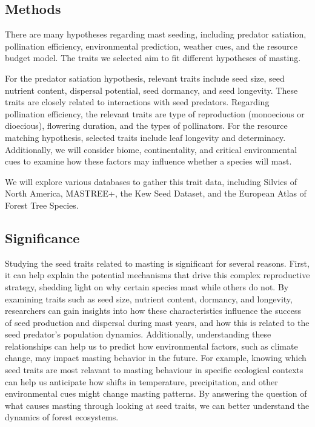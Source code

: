 \documentclass[11pt,letter]{article}
\begin{document}
\subsection{Methods}
There are many hypotheses regarding mast seeding, including predator satiation, pollination efficiency, environmental prediction, weather cues, and the resource budget model. The traits we selected aim to fit different hypotheses of masting.

For the predator satiation hypothesis, relevant traits include seed size, seed nutrient content, dispersal potential, seed dormancy, and seed longevity. These traits are closely related to interactions with seed predators. Regarding pollination efficiency, the relevant traits are type of reproduction (monoecious or dioecious), flowering duration, and the types of pollinators. For the resource matching hypothesis, selected traits include leaf longevity and determinacy. Additionally, we will consider biome, continentality, and critical environmental cues to examine how these factors may influence whether a species will mast.

We will explore various databases to gather this trait data, including Silvics of North America, MASTREE+, the Kew Seed Dataset, and the European Atlas of Forest Tree Species.
\subsection{Significance} 
Studying the seed traits related to masting is significant for several reasons. First, it can help explain the potential mechanisms that drive this complex reproductive strategy, shedding light on why certain species mast while others do not. By examining traits such as seed size, nutrient content, dormancy, and longevity, researchers can gain insights into how these characteristics influence the success of seed production and dispersal during mast years, and how this is related to the seed predator's population dynamics.
Additionally, understanding these relationships can help us to predict how environmental factors, such as climate change, may impact masting behavior in the future. For example, knowing which seed traits are most relavant to masting behaviour in specific ecological contexts can help us anticipate how shifts in temperature, precipitation, and other environmental cues might change masting patterns. By answering the question of what causes masting through looking at seed traits, we can better understand the dynamics of forest ecosystems.
\end{document}
